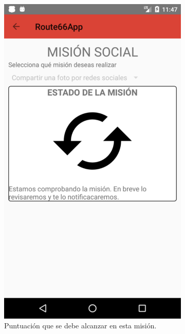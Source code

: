 \documentclass[twoside]{report}
\begin{document}
\begin{figure}[H]
\begin{center}
	\begin{subfigure}[t]{.3\linewidth}
		\includegraphics[scale=0.25]{images/userguide/27.png}
		\caption{Puntuación que se debe alcanzar en esta misión.}
	\end{subfigure}\hspace{2mm}%
	\begin{subfigure}[t]{.3\linewidth}

\end{subfigure}
\end{center}
\end{figure}
\end{document}
